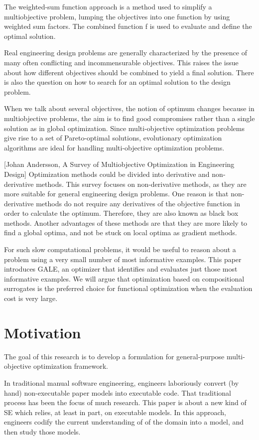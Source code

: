 The weighted-sum function approach is a method used to simplify a multiobjective problem, lumping the objectives into 
one function by using weighted sum factors. The combined function f is used to evaluate and define the optimal solution.

Real engineering design problems are generally characterized by the presence of many
often conflicting and incommensurable objectives. This raises the issue about how
different objectives should be combined to yield a final solution. There is also the
question on how to search for an optimal solution to the design problem. 

When we talk about several objectives, the notion of optimum changes because in multiobjective problems, the aim is to find good compromises rather than a single solution as in global optimization.
Since multi-objective optimization problems give rise to a set of Pareto-optimal solutions, evolutionary 
optimization algorithms are ideal for handling multi-objective optimization problems.

[Johan Andersson, A Survey of Multiobjective Optimization in Engineering Design] 
Optimization methods could be divided into derivative and non-derivative methods. This survey focuses on non-derivative methods, as they are more suitable for
general engineering design problems. One reason is that non-derivative methods do not
require any derivatives of the objective function in order to calculate the optimum.
Therefore, they are also known as black box methods. Another advantages of these
methods are that they are more likely to find a global optima, and not be stuck on local
optima as gradient methods.

For such slow computational problems, it would be useful to reason about a problem using a very small number
 of most informative examples. This paper introduces GALE, an optimizer that identifies and evaluates just those most informative examples.
 We will argue that optimization based on compositional surrogates is the preferred choice for functional optimization when the evaluation cost is very large.


    \section{Motivation}
        The goal of this research is to develop a formulation for
        general-purpose multi-objective optimization framework. \cite{DBLP:journals/corr/abs-1812-07958}

        In traditional manual software engineering, engineers laboriously convert (by hand) non-executable paper models into executable code. 
        That traditional process has been the focus of much research. This paper is about a new kind of SE which relies, at least in part, 
        on executable models. In this approach, engineers codify the current understanding of of the domain into a model, and then study those models.

